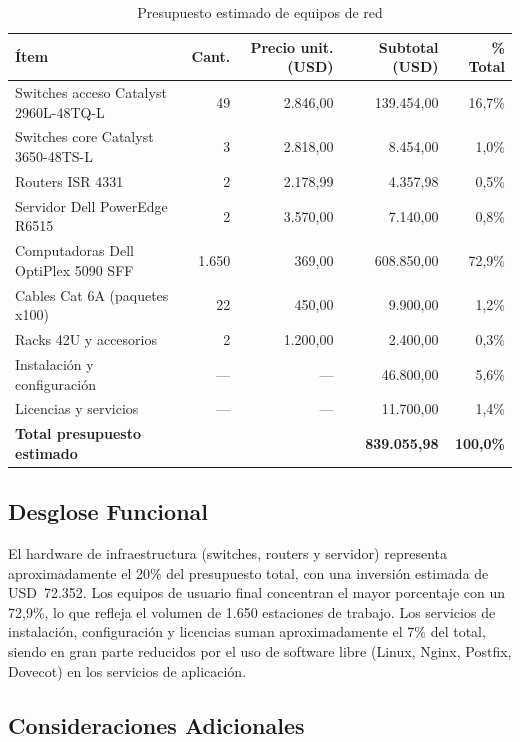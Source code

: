 \begin{table}[H]
\centering
\caption{Presupuesto estimado de equipos de red}
\label{tab:presupuesto}
\begin{tabularx}{\textwidth}{X r r r r}
\toprule
\textbf{Ítem} & \textbf{Cant.} & \textbf{Precio unit. (USD)}
& \textbf{Subtotal (USD)} & \textbf{\% Total} \\
\midrule
Switches acceso Catalyst 2960L-48TQ-L & 49 & 2.846,00 & 139.454,00 & 16,7\% \\
Switches core Catalyst 3650-48TS-L    &  3 & 2.818,00 & 8.454,00   &  1,0\% \\
Routers ISR 4331                      &  2 & 2.178,99 & 4.357,98   &  0,5\% \\
Servidor Dell PowerEdge R6515         &  2 & 3.570,00 & 7.140,00   &  0,8\% \\
Computadoras Dell OptiPlex 5090 SFF   & 1.650 & 369,00 & 608.850,00 & 72,9\% \\
Cables Cat 6A (paquetes x100)         & 22 & 450,00   & 9.900,00   &  1,2\% \\
Racks 42U y accesorios                &  2 & 1.200,00 & 2.400,00   &  0,3\% \\
Instalación y configuración           & --- & ---      & 46.800,00  &  5,6\% \\
Licencias y servicios                 & --- & ---      & 11.700,00  &  1,4\% \\
\midrule
\textbf{Total presupuesto estimado} & & & \textbf{839.055,98} & \textbf{100,0\%} \\
\bottomrule
\end{tabularx}
\end{table}

\subsection{Desglose Funcional}

El hardware de infraestructura (switches, routers y servidor) representa
aproximadamente el 20\% del presupuesto total, con una inversión estimada de
USD~72.352. Los equipos de usuario final concentran el mayor porcentaje con
un 72,9\%, lo que refleja el volumen de 1.650 estaciones de trabajo. Los
servicios de instalación, configuración y licencias suman aproximadamente
el 7\% del total, siendo en gran parte reducidos por el uso de software
libre (Linux, Nginx, Postfix, Dovecot) en los servicios de aplicación.

\subsection{Consideraciones Adicionales}

